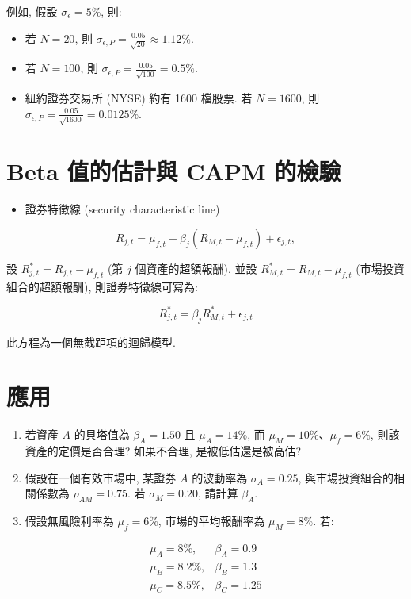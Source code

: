 \documentclass[letterpaper]{article}
\begin{document}
例如, 假設 $\sigma_{\epsilon} = 5\%$, 則: 


\begin{itemize}
	\item 若 $N = 20$, 則 $\sigma_{\epsilon, P} = \frac{0.05}{\sqrt{20}} \approx 1.12\%$. 
	\item 若 $N = 100$, 則 $\sigma_{\epsilon, P} = \frac{0.05}{\sqrt{100}} = 0.5\%$. 
	\item 紐約證券交易所 (NYSE) 約有 1600 檔股票. 若 $N = 1600$, 則 $\sigma_{\epsilon, P} = \frac{0.05}{\sqrt{1600}} = 0.0125\%$. 
\end{itemize}


\section{Beta 值的估計與 CAPM 的檢驗}
\begin{itemize}
	\item 證券特徵線 (security characteristic line) 
\end{itemize}

$$
R_{j, t}=\mu_{f, t}+\beta_{j}\left (R_{M, t}-\mu_{f, t}\right) +\epsilon_{j, t}, 
$$

設 $R_{j, t}^{*} = R_{j, t} - \mu_{f, t}$ (第 $j$ 個資產的超額報酬), 
並設 $R_{M, t}^{*} = R_{M, t} - \mu_{f, t}$ (市場投資組合的超額報酬), 
則證券特徵線可寫為: 

$$
R_{j, t}^{*} = \beta_{j} R_{M, t}^{*} + \epsilon_{j, t}
$$

此方程為一個無截距項的迴歸模型. 

\section*{應用}
\begin{enumerate}
	\item 若資產 $A$ 的貝塔值為 $\beta_{A}=1.50$ 且 $\mu_{A}=14\%$, 而 $\mu_{M}=10\%$、$\mu_{f}=6\%$, 則該資產的定價是否合理? 如果不合理, 是被低估還是被高估? 
	\item 假設在一個有效市場中, 某證券 $A$ 的波動率為 $\sigma_{A}=0.25$, 與市場投資組合的相關係數為 $\rho_{AM}=0.75$. 若 $\sigma_{M}=0.20$, 請計算 $\beta_{A}$. 
	\item 假設無風險利率為 $\mu_{f}=6\%$, 市場的平均報酬率為 $\mu_{M}=8\%$. 若: 
\end{enumerate}


$$
\begin{array}{ll}
\mu_{A}=8 \%, & \beta_{A}=0.9 \\
\mu_{B}=8.2 \%, & \beta_{B}=1.3 \\
\mu_{C}=8.5 \%, & \beta_{C}=1.25
\end{array}
$$
\end{document}
